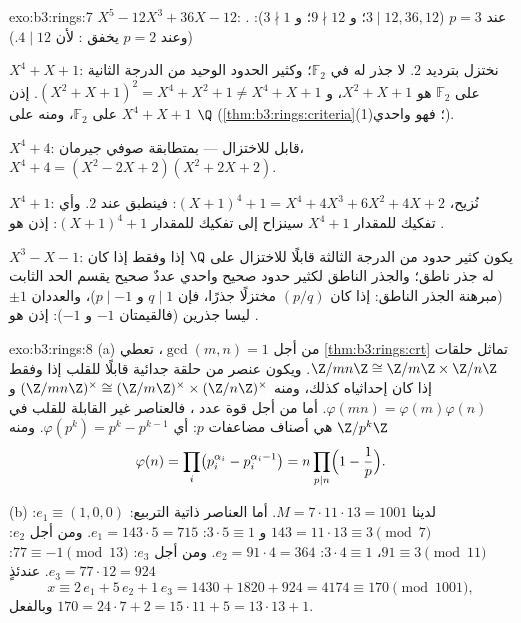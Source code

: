 \begin{solution}{exo:b3:rings:7}
\emph{$X^5 - 12X^3 + 36X - 12$}:  عند $p = 3$ ($3 \mid
12, 36, 12$؛ و $9 \nmid 12$؛
و $3 \nmid 1$): . (وعند $p = 2$ يخفق :
لأن $4 \mid 12$.)

\emph{$X^4 + X + 1$}: نختزل بترديد $2$. لا جذر له في
$\mathbb F_2$؛ وكثير الحدود الوحيد من الدرجة الثانية  على $\mathbb F_2$ هو $X^2 + X +
1$، و $(X^2+X+1)^2 = X^4 + X^2 + 1 \neq X^4 + X + 1$. إذن $X^4 +
X + 1$  على $\mathbb F_2$، ومنه على $\Q$ (\cref{thm:b3:rings:criteria}(1)؛
فهو واحدي).

\emph{$X^4 + 4$}: قابل للاختزال --- بمتطابقة صوفي جيرمان،
$X^4 + 4 = (X^2 - 2X + 2)(X^2 + 2X + 2)$.

\emph{$X^4 + 1$}: نُزيح، $(X+1)^4 + 1 = X^4 + 4X^3 + 6X^2 + 4X +
2$: فينطبق  عند $2$. وأي
تفكيك للمقدار $X^4+1$ سينزاح إلى تفكيك للمقدار $(X+1)^4 + 1$: إذن هو .

\emph{$X^3 - X - 1$}: يكون كثير حدود من الدرجة الثالثة قابلًا
للاختزال على $\Q$ إذا وفقط إذا كان له جذر ناطق؛ والجذر الناطق
لكثير حدود صحيح واحدي عددٌ صحيح يقسم الحد الثابت (مبرهنة الجذر
الناطق: إذا كان $(p/q)$ مختزلًا جذرًا، فإن $q \mid 1$ و
$p \mid -1$)، والعددان $\pm 1$ ليسا جذرين (فالقيمتان $-1$
و $-1$): إذن هو .
\end{solution}

\begin{solution}{exo:b3:rings:8}
(a) من أجل $\gcd(m, n) = 1$، تعطي \cref{thm:b3:rings:crt} تماثل حلقات $\Z/mn\Z \cong \Z/m\Z \times \Z/n\Z$.
ويكون عنصر من حلقة جدائية قابلًا للقلب إذا وفقط إذا كان
إحداثياه كذلك، ومنه
$(\Z/mn\Z)^\times \cong (\Z/m\Z)^\times \times (\Z/n\Z)^\times$
و $\varphi(mn) = \varphi(m)\varphi(n)$. أما من أجل قوة عدد ، فالعناصر غير القابلة للقلب في
$\Z/p^k\Z$ هي أصناف مضاعفات $p$: أي $\varphi(p^k) = p^k - p^{k-1}$. ومنه
\[
\varphi(n) = \prod_i \bigl(p_i^{\alpha_i} -
p_i^{\alpha_i-1}\bigr) = n \prod_{p \mid n}\Bigl(1 -
\frac1p\Bigr).
\]

(b) لدينا $M = 7 \cdot 11 \cdot 13 = 1001$. أما العناصر ذاتية التربيع: $e_1 \equiv
(1, 0, 0)$: $143 = 11\cdot13 \equiv 3 \pmod 7$
و $3 \cdot 5
\equiv 1$: $e_1 = 143 \cdot 5 = 715$. ومن أجل $e_2$: $91 \equiv 3
\pmod{11}$، $3 \cdot 4 \equiv 1$: $e_2 = 91\cdot4 = 364$. ومن
أجل $e_3$: $77 \equiv -1 \pmod{13}$: $e_3 = 77 \cdot 12 = 924$. عندئذٍ
\[
x \equiv 2\,e_1 + 5\,e_2 + 1\,e_3 = 1430 + 1820 + 924 = 4174
\equiv 170 \pmod{1001},
\]
وبالفعل $170 = 24\cdot7 + 2 = 15\cdot11 + 5 = 13\cdot13 + 1$.
\end{solution}

